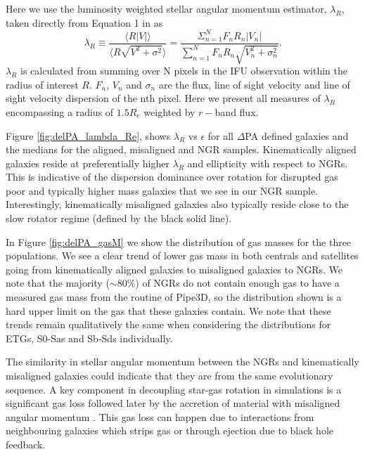 \documentclass[fleqn,usenatbib]{mnras}
\begin{document}
Here we use the luminosity weighted stellar angular momentum estimator, $\lambda_R$, taken directly from Equation 1 in \citet{emsellem2007} as
\begin{equation}
\lambda_{R} \equiv \frac{\langle R | V | \rangle}{ \langle R \sqrt{ V^{2} + \sigma^{2} } \rangle } = \frac{ \Sigma_{ n = 1 }^{ N } F_{ n } R_ { n } \left| V_{ n } \right| }{ \sum_{ n = 1 }^{ N } F_{n} R_{ n } \sqrt{ V_{ n }^{ 2 } + \sigma_{ n }^{ 2 } } }.
\end{equation}
$\lambda_R$ is calculated from summing over N pixels in the IFU observation within the radius of interest $R$. $F_{n}$, $V_{n}$ and $\sigma_{n}$ are the flux, line of sight velocity and line of sight velocity dispersion of the nth pixel. Here we present all measures of $\lambda_R$ encompassing a radius of $1.5R_e$ weighted by $r-$band flux. 

Figure \ref{fig:delPA_lambda_Re}, shows $\lambda_R$ vs $\epsilon$ for all $\Delta$PA defined galaxies and the medians for the aligned, misaligned and NGR samples. Kinematically aligned galaxies reside at preferentially higher $\lambda_R$ and ellipticity with respect to NGRs. This is indicative of the dispersion dominance over rotation for disrupted gas poor and typically higher mass galaxies that we see in our NGR sample. Interestingly, kinematically misaligned galaxies also typically reside close to the slow rotator regime (defined by the black solid line). 

In Figure \ref{fig:delPA_gasM} we show the distribution of gas masses for the three populations. We see a clear trend of lower gas mass in both centrals and satellites going from kinematically aligned galaxies to misaligned galaxies to NGRs. We note that the majority ($\sim$80\%) of NGRs do not contain enough gas to have a measured gas mass from the routine of Pipe3D, so the distribution shown is a hard upper limit on the gas that these galaxies contain. We note that these trends remain qualitatively the same when considering the distributions for ETGs, S0-Sas and Sb-Sds individually.

The similarity in stellar angular momentum between the NGRs and kinematically misaligned galaxies could indicate that they are from the same evolutionary sequence. A key component in decoupling star-gas rotation in simulations is a significant gas loss followed later by the accretion of material with misaligned angular momentum \citep[][]{vdvoort2015, starkenburg+19}. This gas loss can happen due to interactions from neighbouring galaxies which strips gas or through ejection due to black hole feedback.
\end{document}
